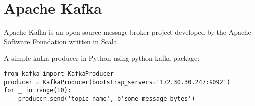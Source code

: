 \section{Apache Kafka}

\href{https://en.wikipedia.org/wiki/Apache_Kafka}{Apache Kafka} is an
open-source message broker project developed by the Apache Software Foundation written in Scala.


A simple kafka producer in Python using python-kafka package:
\begin{verbatim}
from kafka import KafkaProducer
producer = KafkaProducer(bootstrap_servers='172.30.30.247:9092')
for _ in range(10):
    producer.send('topic_name', b'some_message_bytes') 
\end{verbatim}

